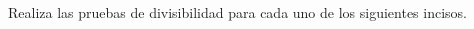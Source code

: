 \question[20] Realiza las pruebas de divisibilidad para cada uno de los siguientes incisos.
\begin{multicols}{2}
    \begin{parts}
        {\printanswers
            
        }
        
        
        
        
        
        
        
        
        
    \end{parts}
\end{multicols}